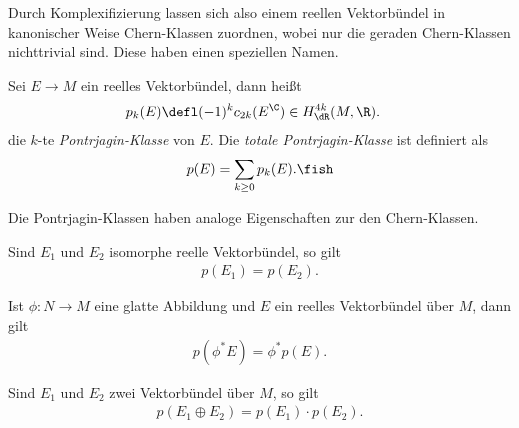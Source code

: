 \documentclass[%
	paper=a5,%
	fleqn,%
	DIV=18,%
	BCOR=0mm,
	fontsize=11pt,
	titlepage=false,%
	bibliography=totoc,
	DIV=18,%
	twoside=true,
	pdftitle=Riemannsche Geometrie,
	pdfauthor=Uwe Semmelmann,
	numbers=noendperiod]%
	{scrbook}
\begin{document}
Durch Komplexifizierung lassen sich also einem reellen Vektorbündel in kanonischer Weise Chern-Klassen zuordnen, wobei nur die geraden Chern-Klassen nichttrivial sind. Diese haben einen speziellen Namen.

\begin{defn}
Sei $E\to M$ ein reelles Vektorbündel, dann heißt
\begin{align*}
p_{k}(E) &\defl (-1)^k c_{2k}(E^\C) \in H_{\dR}^{4k}(M,\R).
\end{align*}
die $k$-te \emph{Pontrjagin-Klasse} von $E$. Die \emph{totale Pontrjagin-Klasse} ist definiert als
\begin{align*}
p(E) = \sum_{k\ge 0} p_{k}(E).\fish
\end{align*}
\end{defn}

Die Pontrjagin-Klassen haben analoge Eigenschaften zur den Chern-Klassen.

\begin{prop}
\begin{propenum}
\item Sind $E_{1}$ und $E_{2}$ isomorphe reelle Vektorbündel, so gilt
\begin{align*}
p(E_{1}) = p(E_{2}).
\end{align*}
\item Ist $\phi: N\to M$ eine glatte Abbildung und $E$ ein reelles Vektorbündel über $M$, dann gilt
\begin{align*}
p(\phi^* E) = \phi^* p(E).
\end{align*}
\item Sind $E_{1}$ und $E_{2}$ zwei Vektorbündel über $M$, so gilt
\begin{align*}
p(E_{1}\oplus E_{2}) = p(E_{1})\cdot p(E_{2}).
\end{align*}
\end{propenum}
\end{prop}
\end{document}
